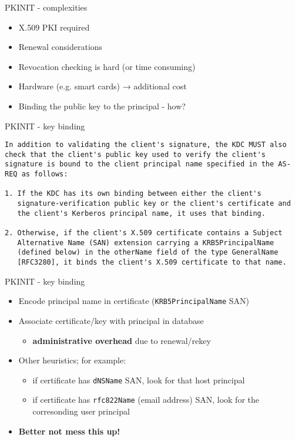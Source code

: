 \documentclass[ignorenonframetext,aspectratio=169,12pt]{beamer}
\begin{document}
\begin{frame}{PKINIT - complexities}
\protect\hypertarget{pkinit-complexities}{}
\begin{itemize}
    \item X.509 PKI required
    \item Renewal considerations
    \item Revocation checking is hard (or time consuming)
    \item Hardware (e.g. smart cards) → additional cost
    \item Binding the public key to the principal - how?
\end{itemize}
\end{frame}

\begin{frame}[fragile]{PKINIT - key binding}
\protect\hypertarget{pkinit-key-binding-1}{}
\small
\begin{verbatim}
In addition to validating the client's signature, the KDC MUST also
check that the client's public key used to verify the client's
signature is bound to the client principal name specified in the AS-
REQ as follows:

1. If the KDC has its own binding between either the client's
   signature-verification public key or the client's certificate and
   the client's Kerberos principal name, it uses that binding.

2. Otherwise, if the client's X.509 certificate contains a Subject
   Alternative Name (SAN) extension carrying a KRB5PrincipalName
   (defined below) in the otherName field of the type GeneralName
   [RFC3280], it binds the client's X.509 certificate to that name.
\end{verbatim}
\end{frame}

\begin{frame}{PKINIT - key binding}
\protect\hypertarget{pkinit-key-binding-2}{}
\begin{itemize}
    \item Encode principal name in certificate ({\tt KRB5PrincipalName} SAN)
    \item Associate certificate/key with principal in database
        \begin{itemize}
            \item {\bf administrative overhead} due to renewal/rekey 
        \end{itemize}
    \item Other heuristics; for example:
        \begin{itemize}
            \item if certificate has {\tt dNSName} SAN,
                look for that host principal
            \item if certificate has {\tt rfc822Name} (email address) SAN,
                look for the corresonding user principal
        \end{itemize}
    \item {\bf Better not mess this up!}
\end{itemize}
\end{frame}
\end{document}
